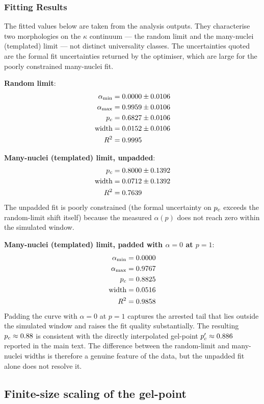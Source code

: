\subsubsection{Fitting Results}
The fitted values below are taken from the analysis outputs. They characterise two morphologies on the $\kappa$ continuum --- the random limit and the many-nuclei (templated) limit --- not distinct universality classes. The uncertainties quoted are the formal fit uncertainties returned by the optimiser, which are large for the poorly constrained many-nuclei fit.

\textbf{Random limit}:
\begin{align}
\alpha_{\min} &= 0.0000 \pm 0.0106 \\
\alpha_{\max} &= 0.9959 \pm 0.0106 \\
p_c &= 0.6827 \pm 0.0106 \\
\text{width} &= 0.0152 \pm 0.0106 \\
R^2 &= 0.9995
\end{align}

\textbf{Many-nuclei (templated) limit, unpadded}:
\begin{align}
p_c &= 0.8000 \pm 0.1392 \\
\text{width} &= 0.0712 \pm 0.1392 \\
R^2 &= 0.7639
\end{align}
The unpadded fit is poorly constrained (the formal uncertainty on $p_c$ exceeds the random-limit shift itself) because the measured $\alpha(p)$ does not reach zero within the simulated window.

\textbf{Many-nuclei (templated) limit, padded with $\alpha=0$ at $p=1$}:
\begin{align}
\alpha_{\min} &= 0.0000 \\
\alpha_{\max} &= 0.9767 \\
p_c &= 0.8825 \\
\text{width} &= 0.0516 \\
R^2 &= 0.9858
\end{align}
Padding the curve with $\alpha=0$ at $p=1$ captures the arrested tail that lies outside the simulated window and raises the fit quality substantially. The resulting $p_c \approx 0.88$ is consistent with the directly interpolated gel-point $p_c' \approx 0.886$ reported in the main text. The difference between the random-limit and many-nuclei widths is therefore a genuine feature of the data, but the unpadded fit alone does not resolve it.

\subsection{Finite-size scaling of the gel-point}

